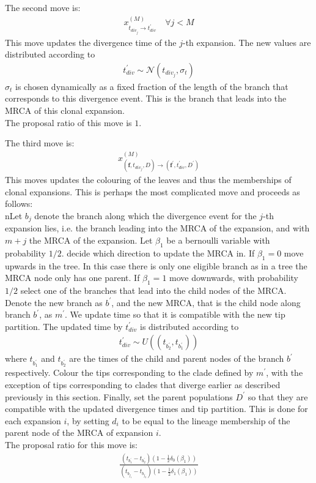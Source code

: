\documentclass{report}
\theoremstyle{definition}
\begin{document}
The second move is:
\begin{gather}
x^{(M)}_{t_{div_j}\to t_{div}^{'}}\quad\forall j < M
\end{gather} 
This move updates the divergence time of the $j$-th expansion. The new values are distributed according to
\begin{gather}
t_{div}^{'}\sim\mathcal{N}(t_{div_j}, \sigma_t)
\end{gather}
$\sigma_t$ is chosen dynamically as a fixed fraction of the length of the branch that corresponds to this divergence event. This is the branch that leads into the MRCA of this clonal expansion.\\
The proposal ratio of this move is $1$.

The third move is:
\begin{gather}
x^{(M)}_{\left(\mathbf{f}, t_{div_j}, D\right)\to \left(\mathbf{f}^{'}, t_{div}^{'}, D^{'}\right)}
\end{gather} 
This moves updates the colouring of the leaves and thus the memberships of clonal expansions. This is perhaps the most complicated move and proceeds as follows: \\
nLet $b_j$ denote the branch along which the divergence event for the $j$-th expansion lies, i.e. the branch leading into the MRCA of the expansion, and with $m+j$ the MRCA of the expansion. Let $\beta_1$ be a bernoulli variable with probability $1/2$. decide which direction to update the MRCA in. If $\beta_1=0$ move upwards in the tree. In this case there is only one eligible branch as in a tree the MRCA node only has one parent. If $\beta_1 = 1$ move downwards, with probability $1/2$ select one of the branches that lead into the child nodes of the MRCA. Denote the new branch as $b^{'}$, and the new MRCA, that is the child node along branch $b^{'}$, as $m^{'}$.
We update time so that it is compatible with the new tip partition. The updated time by $t_{div}^{'}$ is distributed according to
\begin{gather}
t_{div}^{'}\sim U((t_{b^{'}_2}, t_{b^{'}_1}))
\end{gather}
where $t_{b^{'}_1}$ and $t_{b^{'}_2}$ are the times of the child and parent nodes of the branch $b^{'}$ respectively. 
Colour the tips corresponding to the clade defined by $m^{'}$, with the exception of tips corresponding to clades that diverge earlier as described previously in this section.
Finally, set the parent populations $D^{'}$ so that they are compatible with the updated divergence times and tip partition. This is done for each expansion $i$, by setting $d_i$ to be equal to the lineage membership of the parent node of the MRCA of expansion $i$.\\
The proposal ratio for this move is:
\begin{gather}
\frac{\left(t_{b^{'}_1}-t_{b^{'}_2}\right)\left(1-\frac{1}{2}\delta_0\left(\beta_1\right)\right)}{\left(t_{b_{j_1}} - t_{b_{j_2}}\right)\left(1-\frac{1}{2}\delta_1\left(\beta_1\right)\right)}
\end{gather}
\end{document}
